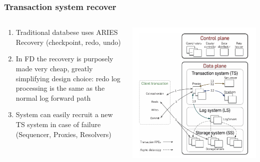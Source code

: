 \begin{frame}
    \frametitle{Transaction system recover}
    \begin{columns}
        \begin{column}{0.5\textwidth}
            \begin{enumerate}
                \item Traditional databese uses ARIES Recovery (checkpoint, redo, undo)
                \item In FD the recovery is purposely made very cheap, greatly simplifying design choice: redo log processing is the same as the normal log forward path
                \item System can easily recruit a new TS system in case of failure (Sequencer, Proxies, Resolvers)
            \end{enumerate}
        \end{column}
        \begin{column}{0.5\textwidth}
            \centering
            \includegraphics[width=\textwidth]{img/2-Architecture/Architecture and transaction processing.png}
        \end{column}
    \end{columns}
\end{frame}

